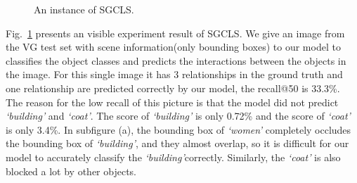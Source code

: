\begin{figure}[H]
	\caption[An instance of SGCLS]{An instance of SGCLS.}
	\label{fig:sgcls}
\end{figure}

Fig.~\ref{fig:sgcls} presents an visible experiment result of SGCLS. We give an image from the VG test set with scene information(only bounding boxes) to our  model to classifies the object classes and predicts the interactions between the objects in the image. For this single image it has 3 relationships in the ground truth and one relationship are predicted correctly by our model, the recall@50 is 33.3\%. The reason for the low recall of this picture is that the model did not predict \textit{`building'} and \textit{`coat'}. The score of \textit{`building'} is only 0.72\% and the score of \textit{`coat'} is only 3.4\%. In subfigure (a), the bounding box of \textit{`women'} completely occludes the bounding box of \textit{`building'}, and they almost overlap, so it is difficult for our model to accurately classify the \textit{`building'}correctly. Similarly,
the \textit{`coat'} is also blocked a lot by other objects.
 
